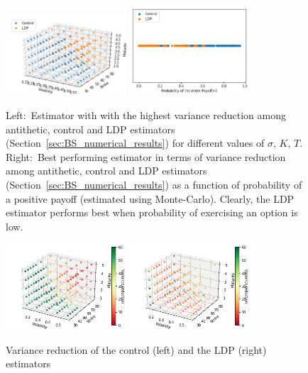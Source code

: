 \begin{figure}[H]
    \centering
    \includegraphics[width=0.4\textwidth]{content/reschap3/Figures/BS/compare1.png}
    \includegraphics[width=0.4\textwidth]{content/reschap3/Figures/BS/compare2.png}
    \caption{\small{Left:~Estimator with with the highest variance reduction among antithetic, control and LDP estimators (Section~\ref{sec:BS_numerical_results}) for different values of $\sigma$, $K$, $T$. Right:~Best performing estimator in terms of variance reduction among antithetic, control and LDP estimators (Section~\ref{sec:BS_numerical_results}) as a function of probability of a positive payoff (estimated using Monte-Carlo). Clearly, the LDP estimator performs best when probability of exercising an option is low.
    }}\label{fig:BSCompare}
\end{figure}
\begin{figure}[H]
    \centering
    \includegraphics[width=0.4\textwidth]{content/reschap3/Figures/BS/control.png}
    \includegraphics[width=0.4\textwidth]{content/reschap3/Figures/BS/ldp.png}
    \caption{\small{Variance reduction of the control (left) and 
     the LDP (right) estimators}
     }\label{fig:BSLDP}
\end{figure}

